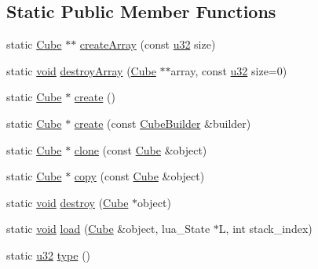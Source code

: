\subsection*{Static Public Member Functions}
\begin{DoxyCompactItemize}
\item 
static \mbox{\hyperlink{classnjli_1_1_cube}{Cube}} $\ast$$\ast$ \mbox{\hyperlink{classnjli_1_1_cube_a09daf73917a428668773bc73fc9a50bd}{create\+Array}} (const \mbox{\hyperlink{_util_8h_a10e94b422ef0c20dcdec20d31a1f5049}{u32}} size)
\item 
static \mbox{\hyperlink{_thread_8h_af1e856da2e658414cb2456cb6f7ebc66}{void}} \mbox{\hyperlink{classnjli_1_1_cube_a17131ffef5be91b5b1497dad7d377954}{destroy\+Array}} (\mbox{\hyperlink{classnjli_1_1_cube}{Cube}} $\ast$$\ast$array, const \mbox{\hyperlink{_util_8h_a10e94b422ef0c20dcdec20d31a1f5049}{u32}} size=0)
\item 
static \mbox{\hyperlink{classnjli_1_1_cube}{Cube}} $\ast$ \mbox{\hyperlink{classnjli_1_1_cube_a1d95c5c13758c11235c31811f4590eac}{create}} ()
\item 
static \mbox{\hyperlink{classnjli_1_1_cube}{Cube}} $\ast$ \mbox{\hyperlink{classnjli_1_1_cube_a16ae2ea03d7ffbafc57b9ce92bd4b834}{create}} (const \mbox{\hyperlink{classnjli_1_1_cube_builder}{Cube\+Builder}} \&builder)
\item 
static \mbox{\hyperlink{classnjli_1_1_cube}{Cube}} $\ast$ \mbox{\hyperlink{classnjli_1_1_cube_a763f1af98f3d6b392f2f759d0704a716}{clone}} (const \mbox{\hyperlink{classnjli_1_1_cube}{Cube}} \&object)
\item 
static \mbox{\hyperlink{classnjli_1_1_cube}{Cube}} $\ast$ \mbox{\hyperlink{classnjli_1_1_cube_a5df2064e5a8248947522ef439b7d0acd}{copy}} (const \mbox{\hyperlink{classnjli_1_1_cube}{Cube}} \&object)
\item 
static \mbox{\hyperlink{_thread_8h_af1e856da2e658414cb2456cb6f7ebc66}{void}} \mbox{\hyperlink{classnjli_1_1_cube_a4c62e4381c762c382f413c66ffe6a3fc}{destroy}} (\mbox{\hyperlink{classnjli_1_1_cube}{Cube}} $\ast$object)
\item 
static \mbox{\hyperlink{_thread_8h_af1e856da2e658414cb2456cb6f7ebc66}{void}} \mbox{\hyperlink{classnjli_1_1_cube_a8a3faa56dd3529d271f35df2d550d3cf}{load}} (\mbox{\hyperlink{classnjli_1_1_cube}{Cube}} \&object, lua\+\_\+\+State $\ast$L, int stack\+\_\+index)
\item 
static \mbox{\hyperlink{_util_8h_a10e94b422ef0c20dcdec20d31a1f5049}{u32}} \mbox{\hyperlink{classnjli_1_1_cube_a97051b1445b3ff0a8d394ba4d550c451}{type}} ()
\end{DoxyCompactItemize}
